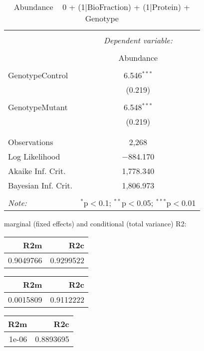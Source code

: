 \documentclass[11pt]{report}
\begin{document}
\begin{table}[!htbp] \centering 
  \caption{Abundance ~ 0 + (1|BioFraction) + (1|Protein) + Genotype} 
  \label{} 
\begin{tabular}{@{\extracolsep{5pt}}lc} 
\\[-1.8ex]\hline 
\hline \\[-1.8ex] 
 & \multicolumn{1}{c}{\textit{Dependent variable:}} \\ 
\cline{2-2} 
\\[-1.8ex] & Abundance \\ 
\hline \\[-1.8ex] 
 GenotypeControl & 6.546$^{***}$ \\ 
  & (0.219) \\ 
  & \\ 
 GenotypeMutant & 6.548$^{***}$ \\ 
  & (0.219) \\ 
  & \\ 
\hline \\[-1.8ex] 
Observations & 2,268 \\ 
Log Likelihood & $-$884.170 \\ 
Akaike Inf. Crit. & 1,778.340 \\ 
Bayesian Inf. Crit. & 1,806.973 \\ 
\hline 
\hline \\[-1.8ex] 
\textit{Note:}  & \multicolumn{1}{r}{$^{*}$p$<$0.1; $^{**}$p$<$0.05; $^{***}$p$<$0.01} \\ 
\end{tabular} 
\end{table} 
marginal (fixed effects) and conditional (total variance) R2:

\begin{tabular}{r|r}
\hline
R2m & R2c\\
\hline
0.9049766 & 0.9299522\\
\hline
\end{tabular}

\begin{tabular}{r|r}
\hline
R2m & R2c\\
\hline
0.0015809 & 0.9112222\\
\hline
\end{tabular}

\begin{tabular}{r|r}
\hline
R2m & R2c\\
\hline
1e-06 & 0.8893695\\
\hline
\end{tabular}
\end{document}
